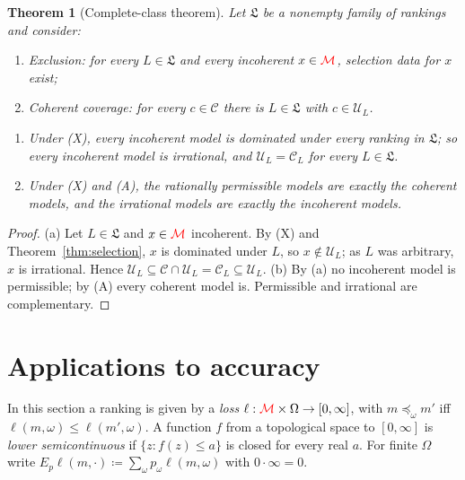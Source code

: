 \documentclass[11pt]{article}
\newcommand{\chg}[1]{{\color{red}#1}}
\newtheorem{theorem}{Theorem}[section]
\theoremstyle{definition}
\theoremstyle{remark}
\newcommand{\M}{\mathcal M}
\newcommand{\C}{\mathcal C}
\newcommand{\U}{\mathcal U}
\newcommand{\Lf}{\mathfrak L}
\begin{document}
\begin{theorem}[Complete-class theorem]\label{thm:complete-class}
Let $\Lf$ be a \chg{nonempty} family of rankings and consider:
\begin{enumerate}
\item[(X)] \emph{Exclusion}: for every $L\in\Lf$ and every incoherent $x\in\chg{\M}$, selection data for $x$ exist;
\item[(A)] \emph{Coherent coverage}: for every $c\in\C$ there is $L\in\Lf$ with $c\in\U_L$\chg{.}
\end{enumerate}
\begin{enumerate}[label=(\alph*)]
\item Under (X), every incoherent model is dominated under every ranking in $\Lf$; so every incoherent model is irrational, and $\U_L=\C_L$ for every $L\in\Lf$.
\item Under (X) and (A), the rationally permissible models are exactly the coherent models, and the irrational models are exactly the incoherent models.
\end{enumerate}
\end{theorem}
\begin{proof}
(a) Let $L\in\Lf$ and $x\in\chg{\M}$ incoherent. By (X) and Theorem~\ref{thm:selection}, $x$ is dominated under $L$, so $x\notin\U_L$; as $L$ was arbitrary, $x$ is irrational. Hence $\U_L\subseteq\C\cap\U_L=\C_L\subseteq\U_L$.
(b) By (a) no incoherent model is permissible; by (A) every coherent model is. Permissible and irrational are complementary.
\end{proof}

\section{Applications to accuracy}\label{sec:applications}

In this section a ranking is given by a \emph{loss} $\ell:\chg{\M}\times\Omega\to[0,\infty]$, with $m\preceq_\omega m'$ iff $\ell(m,\omega)\le\ell(m',\omega)$. A function $f$ from a topological space to $[0,\infty]$ is \emph{lower semicontinuous} if $\{z:f(z)\le a\}$ is closed for every real $a$. For finite $\Omega$ write $E_p\ell(m,\cdot)\coloneqq\sum_\omega p_\omega\ell(m,\omega)$ with $0\cdot\infty=0$.
\end{document}
